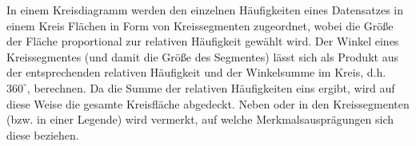 \documentclass{lecture}
\begin{document}
    In einem Kreisdiagramm werden den einzelnen Häufigkeiten eines Datensatzes in einem Kreis Flächen in Form von Kreissegmenten zugeordnet, wobei die Größe der Fläche proportional zur relativen Häufigkeit gewählt wird.
    Der Winkel eines Kreissegmentes (und damit die Größe des Segmentes) lässt sich als Produkt aus der entsprechenden relativen Häufigkeit und der Winkelsumme im Kreis, d.h. \(360^\circ\), berechnen.
    Da die Summe der relativen Häufigkeiten eins ergibt, wird auf diese Weise die gesamte Kreisfläche abgedeckt.
    Neben oder in den Kreissegmenten (bzw. in einer Legende) wird vermerkt, auf welche Merkmalsausprägungen sich diese beziehen.
    \begin{center}
    \end{center}
\end{document}
